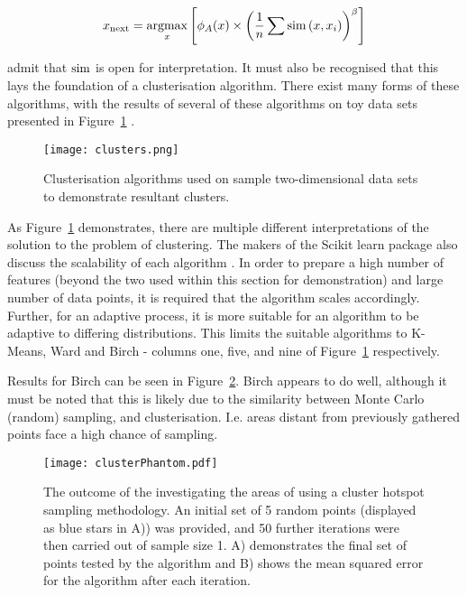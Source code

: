 \begin{equation}
    \label{eq:Settles_density}
    x_\mathrm{next}=\operatorname*{argmax}_x{\left[\phi_A(x)\times{\left(\frac{1}{n}\sum{\operatorname*{sim}{(x, x_i)}}\right)}^\beta\right]}
\end{equation}

\textcite{Set08} admit that $\operatorname*{sim}$ is open for interpretation. It must also be recognised that this lays the foundation of a clusterisation algorithm. There exist many forms of these algorithms, with the results of several of these algorithms on toy data sets presented in Figure~\ref{fig:ClusterResults} \cite{SciClus}.

\begin{figure}[H]
    \begin{center}
        \texttt{[image: clusters.png]}
        \caption[Comparison of Clusterisation Algorithms]{Clusterisation algorithms used on sample two-dimensional data sets to demonstrate resultant clusters.}
        \label{fig:ClusterResults}
    \end{center}
\end{figure}

As Figure~\ref{fig:ClusterResults} demonstrates, there are multiple different interpretations of the solution to the problem of clustering. The makers of the Scikit learn package also discuss the scalability of each algorithm \cite{SciClus}. In order to prepare a high number of features (beyond the two used within this section for demonstration) and large number of data points, it is required that the algorithm scales accordingly. Further, for an adaptive process, it is more suitable for an algorithm to be adaptive to differing distributions. This limits the suitable algorithms to K-Means, Ward and Birch - columns one, five, and nine of Figure~\ref{fig:ClusterResults} respectively.

Results for Birch can be seen in Figure~\ref{fig:clusterPhantom}. Birch appears to do well, although it must be noted that this is likely due to the similarity between Monte Carlo (random) sampling, and clusterisation. I.e. areas distant from previously gathered points face a high chance of sampling.

\begin{figure}[H]
    \begin{center}
        \texttt{[image: clusterPhantom.pdf]}
        \caption[Cluster Hotspot Sampling Illustration]{The outcome of the investigating the areas of using a cluster hotspot sampling methodology. An initial set of 5 random points (displayed as blue stars in A)) was provided, and 50 further iterations were then carried out of sample size 1. A) demonstrates the final set of points tested by the algorithm and B) shows the mean squared error for the algorithm after each iteration.}
        \label{fig:clusterPhantom}
    \end{center}
\end{figure}


